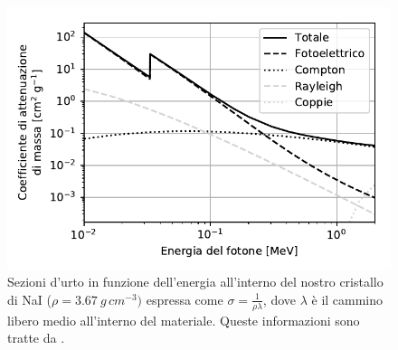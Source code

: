 \begin{figure}[h]
\centering
\includegraphics[width=25 em]{immagini/cross}
\caption{\label{fig:cross}
Sezioni d'urto in funzione dell'energia all'interno del nostro cristallo di NaI ($\rho=\SI{3.67}{g\,cm^{-3}})$ espressa come $\sigma=\frac{1}{\rho\lambda}$, dove $\lambda$ è il cammino libero medio all'interno del materiale. Queste informazioni sono tratte da \cite{cross}.}
\label{sezioni}
\end{figure}

